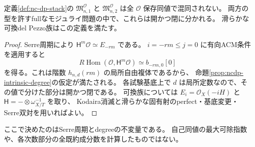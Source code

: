 \begin{corollary}[定義したモジュライ問題での次数の開閉分解]
\label{cor:defined-moduli-degree-separation}
定義\ref{def:nc-dp-stack}の $\mathfrak M^{\mathcal O}_{n,1}$ と
$\mathfrak M^{\mathcal O}_{n,2}$ は全 $\mathcal O$ 保存同値で混同されない。
両方の型を許すfullなモジュライ問題の中で、これらは開かつ閉に分かれる。
滑らかな可換del Pezzo族はこの定義を満たす。
\end{corollary}
\begin{proof}
Serre周期により $\mathsf H^m\mathcal O\simeq E_{-rm}$ である。
$i=-rm\le j=0$ に有向ACM条件を適用すると
\[
 R\operatorname{Hom}(\mathcal O,\mathsf H^m\mathcal O)
 \simeq b_{-rm,0}[0]
\]
を得る。これは階数 $h_{n,d}(rm)$ の局所自由複体であるから、
命題\ref{prop:ncdp-intrinsic-degree}の仮定が満たされる。
各試験基底上で $d$ は局所定数なので、その値で分けた部分は開かつ閉である。
可換族については $E_i=\mathcal O_X(-iH)$ と
$\mathsf H=-\otimes\omega_{X/T}^{-1}$ を取り、
Kodaira消滅と滑らかな固有射のperfect・基底変更・Serre双対を用いればよい。
\end{proof}

ここで決めたのはSerre周期とdegreeの不変量である。
自己同値の最大可除指数や、各次数部分の全既約成分数を計算したものではない。
